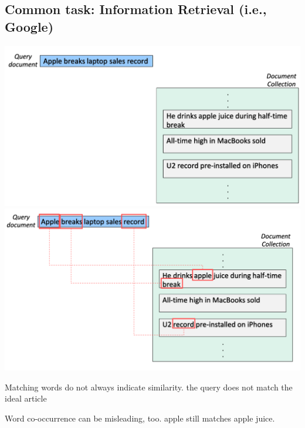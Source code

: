 \documentclass[11pt]{article}
\theoremstyle{definition}
\begin{document}
\subsection{Common task: Information Retrieval (i.e., Google)}

\includegraphics[width=\textwidth/2-2.08049pt]{2.png}
\includegraphics[width=\textwidth/2]{3.png}

Matching words do not always indicate similarity.
the query does not match the ideal article


Word co-occurrence can be misleading, too.
apple still matches apple juice.
\end{document}
